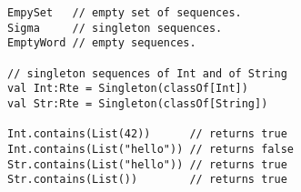 \begin{lstlisting}[style=scalaioScala]
EmpySet   // empty set of sequences.
Sigma     // singleton sequences.
EmptyWord // empty sequences.

// singleton sequences of Int and of String
val Int:Rte = Singleton(classOf[Int])    
val Str:Rte = Singleton(classOf[String])

Int.contains(List(42))      // returns true
Int.contains(List("hello")) // returns false
Str.contains(List("hello")) // returns true
Str.contains(List())        // returns true
\end{lstlisting}
